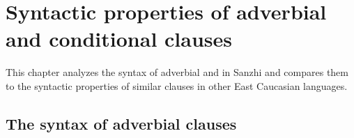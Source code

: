 \chapter{Syntactic properties of adverbial and conditional clauses}
\label{cpt:Syntactic properties of adverbial and conditional clauses}

This chapter analyzes the syntax of adverbial and  in Sanzhi and compares them to the syntactic properties of similar clauses in other East Caucasian languages.



\section{The syntax of adverbial clauses}
\label{sec:The syntax of adverbial clauses}

